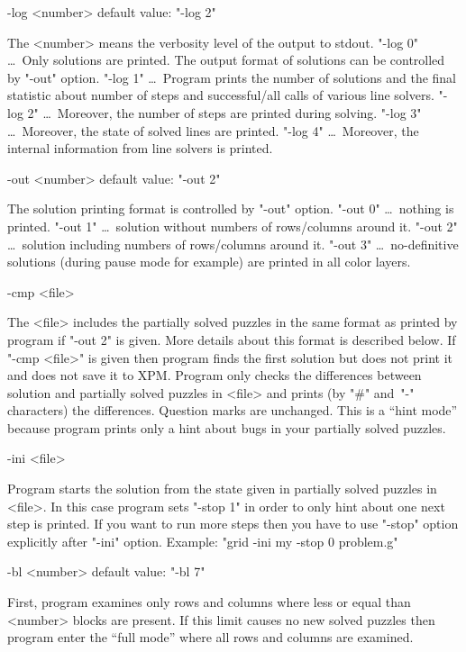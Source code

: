 \para -log <number>              default value: "-log 2"

   The <number> means the verbosity level of the output to stdout.
\bod   "-log 0" \dots\ Only solutions are printed. The output format of
       solutions can be controlled by "-out" option.
\bod   "-log 1" \dots\ Program prints the number of solutions and
       the final statistic about number of steps and successful/all
       calls of various line solvers. 
\bod   "-log 2" \dots\ Moreover, the number of steps are printed
       during solving.
\bod   "-log 3" \dots\ Moreover, the state of solved lines are printed.
\bod   "-log 4" \dots\ Moreover, the internal information from line
       solvers is printed.

\para -out <number>              default value: "-out 2"

   The solution printing format is controlled by "-out" option.
\bod   "-out 0" \dots\ nothing is printed.
\bod   "-out 1" \dots\ solution without numbers of rows/columns around it.
\bod   "-out 2" \dots\ solution including numbers of rows/columns around it.
\bod   "-out 3" \dots\ no-definitive solutions (during pause mode for example)
        are printed in all color layers.

\para -cmp <file>               

   The <file> includes the partially solved puzzles in the same
   format as printed by program if "-out 2" is given. More details
   about this format is described below.
   If "-cmp <file>" is given then program finds the first solution 
   but does not print it and does not save it to XPM. Program only
   checks the differences between solution and partially solved 
   puzzles in <file> and prints (by "#" and~"-" characters) the 
   differences. Question marks are unchanged. This is a ``hint mode''
   because program prints only a hint about bugs in your partially
   solved puzzles.

\para -ini <file>

   Program starts the solution from the state given in partially
   solved puzzles in <file>. In this case program sets 
   "-stop 1" in order to only hint about one next step is printed.
   If you want to run more steps then you have to use
   "-stop" option explicitly after "-ini" option. Example:
   "grid -ini my -stop 0 problem.g"

\para -bl <number>                  default value: "-bl 7"

   First, program examines only rows and columns where less or equal than
   <number> blocks are present. If this limit causes no new solved
   puzzles then program enter the ``full mode'' where all rows and
   columns are examined.

